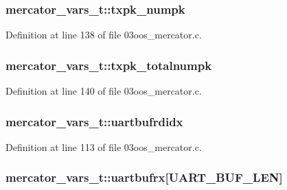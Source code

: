 \subsubsection[{\texorpdfstring{txpk\+\_\+numpk}{txpk_numpk}}]{ mercator\+\_\+vars\+\_\+t\+::txpk\+\_\+numpk}\hypertarget{structmercator__vars__t_a3833c36db58b2fb90b1523b23d6caf75}{}\label{structmercator__vars__t_a3833c36db58b2fb90b1523b23d6caf75}


Definition at line 138 of file 03oos\+\_\+mercator.\+c.

\subsubsection[{\texorpdfstring{txpk\+\_\+totalnumpk}{txpk_totalnumpk}}]{ mercator\+\_\+vars\+\_\+t\+::txpk\+\_\+totalnumpk}\hypertarget{structmercator__vars__t_a0bc47aeae8173953b7032dc631606b23}{}\label{structmercator__vars__t_a0bc47aeae8173953b7032dc631606b23}


Definition at line 140 of file 03oos\+\_\+mercator.\+c.

\subsubsection[{\texorpdfstring{uartbufrdidx}{uartbufrdidx}}]{ mercator\+\_\+vars\+\_\+t\+::uartbufrdidx}\hypertarget{structmercator__vars__t_a5a821ce8256f962279b0616e29fd2870}{}\label{structmercator__vars__t_a5a821ce8256f962279b0616e29fd2870}


Definition at line 113 of file 03oos\+\_\+mercator.\+c.

\subsubsection[{\texorpdfstring{uartbufrx}{uartbufrx}}]{ mercator\+\_\+vars\+\_\+t\+::uartbufrx\mbox{[}{\bf U\+A\+R\+T\+\_\+\+B\+U\+F\+\_\+\+L\+EN}\mbox{]}}\hypertarget{structmercator__vars__t_a607c1c6ad567fd7ca9c6e47a1e05f313}{}\label{structmercator__vars__t_a607c1c6ad567fd7ca9c6e47a1e05f313}


